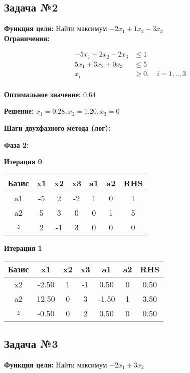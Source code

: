 \documentclass[a4paper,12pt]{article}
\begin{document}
\subsection*{Задача №2}
\textbf{Функция цели: }
Найти максимум $ -2x_{1} +1x_{2} -3x_{3} $\\

\textbf{Ограничения:}

\[ \begin{aligned}
-5x_{1} +2x_{2} -2x_{3} &\le 1 \\
5x_{1} +3x_{2} +0x_{3} &\le 5 \\
x_i &\ge 0,\quad i=1,..,3\\
\end{aligned}\]

\textbf{Оптимальное значение: }$0.64$

\textbf{Решение: }$x_{1}=0.28, x_{2}=1.20, x_{3}=0$

\textbf{Шаги двухфазного метода (лог):}



\textbf{Фаза 2:}


 \textbf{Итерация 0}\\
\begin{tabular}{|c|c|c|c|c|c|c|}
\hline
Базис & x1 & x2 & x3 & a1 & a2 & RHS \\ \hline
a1 & -5 & 2 & -2 & 1 & 0 & 1 \\ \hline
a2 & 5 & 3 & 0 & 0 & 1 & 5 \\ \hline
$z$ & 2 & -1 & 3 & 0 & 0 & 0 \\ \hline
\end{tabular}
\vspace{5mm}

 \textbf{Итерация 1}\\
\begin{tabular}{|c|c|c|c|c|c|c|}
\hline
Базис & x1 & x2 & x3 & a1 & a2 & RHS \\ \hline
x2 & -2.50 & 1 & -1 & 0.50 & 0 & 0.50 \\ \hline
a2 & 12.50 & 0 & 3 & -1.50 & 1 & 3.50 \\ \hline
$z$ & -0.50 & 0 & 2 & 0.50 & 0 & 0.50 \\ \hline
\end{tabular}
\vspace{5mm}



\subsection*{Задача №3}
\textbf{Функция цели: }
Найти максимум $ -2x_{1} +3x_{2} $\\
\end{document}
